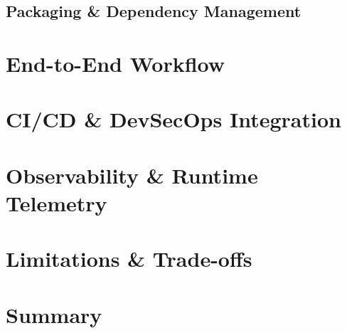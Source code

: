 \subsection{Packaging & Dependency Management}

\section{End-to-End Workflow}

\section{CI/CD & DevSecOps Integration}

\section{Observability & Runtime Telemetry}

\section{Limitations & Trade-offs}

\section{Summary}
